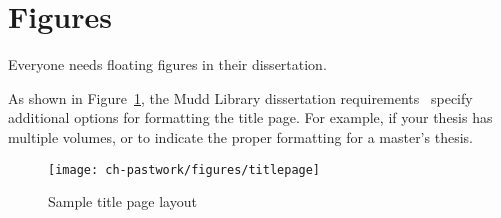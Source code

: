 \section{Figures}
\label{sec:pastwork:figures}

Everyone needs floating figures in their dissertation.

As shown in Figure~\ref{fig:pastwork:titlepage}, the Mudd Library dissertation requirements~\cite{muddthesis2009} specify additional options for formatting the title page. For example, if your thesis has multiple volumes, or to indicate the proper formatting for a master's thesis.

\begin{figure}[htb]
  \begin{center}
    \texttt{[image: ch-pastwork/figures/titlepage]}
    \caption[Sample Title Page Layout]{Sample title page layout~\cite{muddthesis2009}}
    \label{fig:pastwork:titlepage}
  \end{center}
\end{figure}
